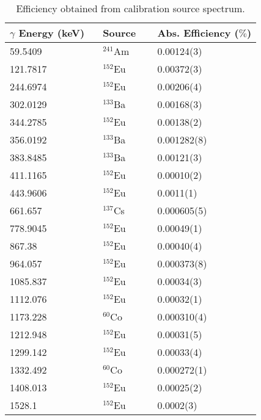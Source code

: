 \begin{table}
\center
\begin{tabular}{lll}
\hline
$\gamma$ Energy (keV) $\,\,\,$ & Source $\,\,\,\,\,$ & Abs. Efficiency ($\%$) \\
\hline \hline
59.5409 & $^{241}$Am & 0.00124(3)\\
121.7817 & $^{152}$Eu & 0.00372(3)\\
244.6974 & $^{152}$Eu & 0.00206(4)\\
302.0129 & $^{133}$Ba & 0.00168(3)\\
344.2785 & $^{152}$Eu & 0.00138(2)\\
356.0192 & $^{133}$Ba & 0.001282(8)\\
383.8485 & $^{133}$Ba & 0.00121(3)\\
411.1165 & $^{152}$Eu & 0.00010(2)\\
443.9606 & $^{152}$Eu & 0.0011(1)\\
661.657 & $^{137}$Cs & 0.000605(5)\\
778.9045 & $^{152}$Eu & 0.00049(1)\\
867.38 & $^{152}$Eu & 0.00040(4)\\
964.057 & $^{152}$Eu & 0.000373(8)\\
1085.837 & $^{152}$Eu & 0.00034(3)\\
1112.076 & $^{152}$Eu & 0.00032(1)\\
1173.228 & $^{60}$Co & 0.000310(4)\\
1212.948 & $^{152}$Eu & 0.00031(5)\\
1299.142 & $^{152}$Eu & 0.00033(4)\\
1332.492 & $^{60}$Co & 0.000272(1)\\
1408.013 & $^{152}$Eu & 0.00025(2)\\
1528.1 & $^{152}$Eu & 0.0002(3)\\
\hline
\end{tabular}
\caption{Efficiency obtained from calibration source spectrum.}
\label{tbl:eff_data}
\end{table}



